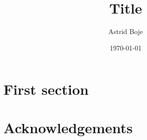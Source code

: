 \documentclass[aspectratio=169]{beamer}
\title{\huge{\textbf{Title}}}
\author{Astrid Boje}
\date{\small\today}
\begin{document}
	
	\mytitleframe
	
	\section{First section}
	
	
	
	\section{Acknowledgements}
	
	
\end{document}
